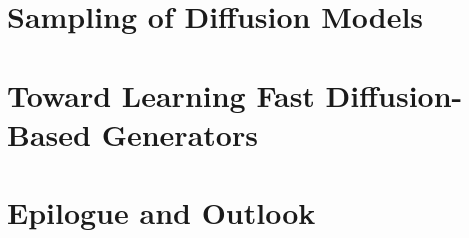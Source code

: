 \documentclass[examplefnt,biber]{nowfnt-arxiv} %
\newtheorem[M]{question}{\sffamily\bfseries Question}[section]
\begin{document}
\part{Sampling of Diffusion Models}




\part{Toward Learning Fast Diffusion-Based Generators}



\part*{Epilogue and Outlook}

% 




\appendix










\backmatter  %




\printbibliography
\end{document}
